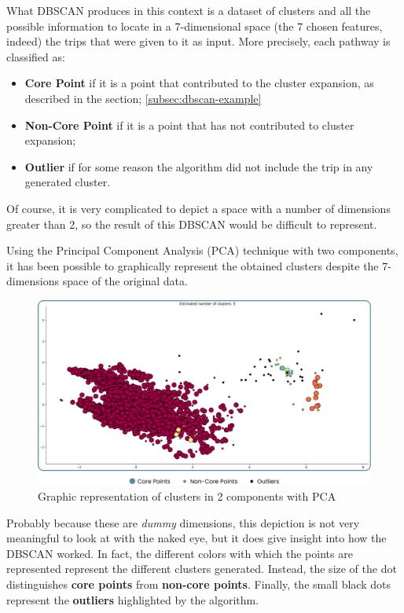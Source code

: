 What DBSCAN produces in this context is a dataset of clusters and all the possible information to locate in a 7-dimensional space (the 7 chosen features, indeed) the trips that were given to it as input.
More precisely, each pathway is classified as:
\begin{itemize}
\item \textbf{Core Point} if it is a point that contributed to the cluster expansion, as described in the section; \ref{subsec:dbscan-example}
\item \textbf{Non-Core Point} if it is a point that has not contributed to cluster expansion;
\item \textbf{Outlier} if for some reason the algorithm did not include the trip in any generated cluster.
\end{itemize}

Of course, it is very complicated to depict a space with a number of dimensions greater than 2, so the result of this DBSCAN would be difficult to represent.

Using the Principal Component Analysis (PCA) technique with two components, it has been possible to graphically represent the obtained clusters despite the 7-dimensions space of the original data.

\begin{figure}[H]
    \centering
    \includegraphics[width=13cm]{Images/3/clusters.png}
    \caption{Graphic representation of clusters in 2 components with PCA}
\end{figure}

Probably because these are \textit{dummy} dimensions, this depiction is not very meaningful to look at with the naked eye, but it does give insight into how the DBSCAN worked. In fact, the different colors with which the points are represented represent the different clusters generated. Instead, the size of the dot distinguishes \textbf{core points} from \textbf{non-core points}. Finally, the small black dots represent the \textbf{outliers} highlighted by the algorithm.


